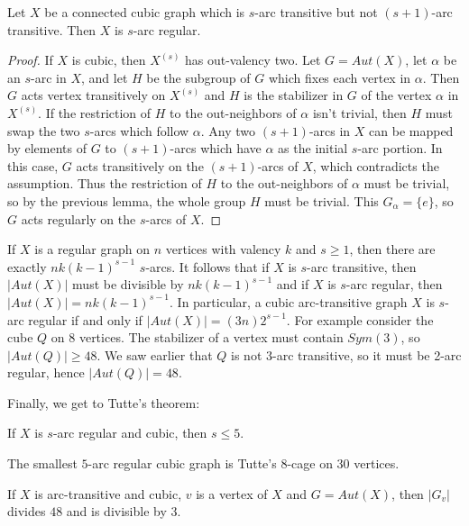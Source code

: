 \begin{lemma}
	Let $X$ be a connected cubic graph which is $s$-arc transitive but not $(s+1)$-arc transitive.  Then $X$ is $s$-arc regular.
\end{lemma}
\begin{proof}
	If $X$ is cubic, then $X^{(s)}$ has out-valency two.  Let $G=Aut(X)$, let $\alpha$ be an $s$-arc in $X$, and let $H$ be the subgroup of $G$ which fixes each vertex in $\alpha$.  Then $G$ acts vertex transitively on $X^{(s)}$ and $H$ is the stabilizer in $G$ of the vertex $\alpha$ in $X^{(s)}$.  If the restriction of $H$ to the out-neighbors of $\alpha$ isn't trivial, then $H$ must swap the two $s$-arcs which follow $\alpha$.  Any two $(s+1)$-arcs in $X$ can be mapped by elements of $G$ to $(s+1)$-arcs which have $\alpha$ as the initial $s$-arc portion.  In this case, $G$ acts transitively on the $(s+1)$-arcs of $X$, which contradicts the assumption.  Thus the restriction of $H$ to the out-neighbors of $\alpha$ must be trivial, so by the previous lemma, the whole group $H$ must be trivial.  This $G_\alpha = \{e\}$, so $G$ acts regularly on the $s$-arcs of $X$.
\end{proof}

If $X$ is a regular graph on $n$ vertices with valency $k$ and $s\geq 1$, then there are exactly $nk(k-1)^{s-1}$ $s$-arcs.  It follows that if $X$ is $s$-arc transitive, then $|Aut(X)|$ must be divisible by $nk(k-1)^{s-1}$ and if $X$ is $s$-arc regular, then $|Aut(X)|=nk(k-1)^{s-1}$.  In particular, a cubic arc-transitive graph $X$ is $s$-arc regular if and only if $|Aut(X)|=(3n)2^{s-1}$.  For example consider the cube $Q$ on $8$ vertices.  The stabilizer of a vertex must contain $Sym(3)$, so $|Aut(Q)|\geq 48$.  We saw earlier that $Q$ is not $3$-arc transitive, so it must be 2-arc regular, hence $|Aut(Q)|=48$.

Finally, we get to Tutte's theorem:

\begin{theorem}[Tutte]
	If $X$ is $s$-arc regular and cubic, then $s\leq 5$.
\end{theorem}

The smallest $5$-arc regular cubic graph is Tutte's 8-cage on 30 vertices.

\begin{corollary}
	If $X$ is arc-transitive and cubic, $v$ is a vertex of $X$ and $G=Aut(X)$, then $|G_v|$ divides $48$ and is divisible by $3$.
\end{corollary}



